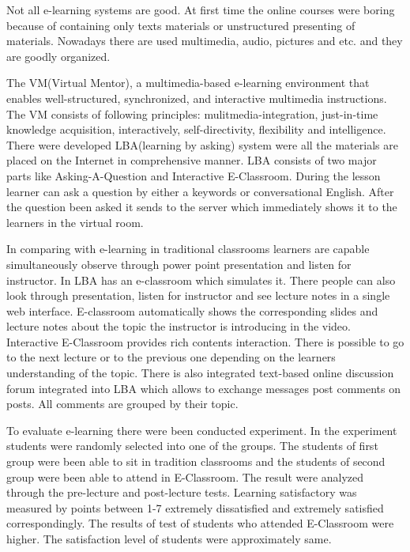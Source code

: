 Not all e-learning systems are good. At first time the online courses were boring because of containing only texts materials or unstructured presenting of materials. Nowadays there are used multimedia, audio, pictures and etc. and they are goodly organized. 

The VM(Virtual Mentor), a multimedia-based e-learning environment that enables well-structured, synchronized, and interactive multimedia instructions. The VM consists of following principles: mulitmedia-integration, just-in-time knowledge acquisition, interactively, self-directivity, flexibility and intelligence. There were developed LBA(learning by asking) system were all the materials are placed on the Internet in comprehensive manner. LBA consists of two major parts like Asking-A-Question and Interactive E-Classroom. During the lesson learner can ask a question by either a keywords or conversational English. After the question been asked it sends to the server which immediately shows it to the learners in the virtual room. 

In comparing with e-learning in traditional classrooms learners are capable simultaneously observe through power point presentation and listen for instructor. In LBA has an e-classroom which simulates it. There people can also look through presentation, listen for instructor and see lecture notes in a single web interface. E-classroom automatically shows the corresponding slides and lecture notes about the topic the instructor is introducing in the video. 
Interactive E-Classroom provides rich contents interaction. There is possible to go to the next lecture or to the previous one depending on the learners understanding of the topic. There is also integrated text-based online discussion forum integrated into LBA which allows to exchange messages post comments on posts. All comments are grouped by their topic.

To evaluate e-learning there were been conducted experiment. In the experiment students were randomly selected into one of the groups. The students of first group were been able to sit in tradition classrooms and the students of second group were been able to attend in E-Classroom. The result were analyzed  through the pre-lecture and post-lecture tests. Learning satisfactory was measured by points between 1-7 extremely dissatisfied and extremely satisfied correspondingly. The results of test of students who attended E-Classroom were higher. The satisfaction level of students were approximately same.\cite{Dansong}

